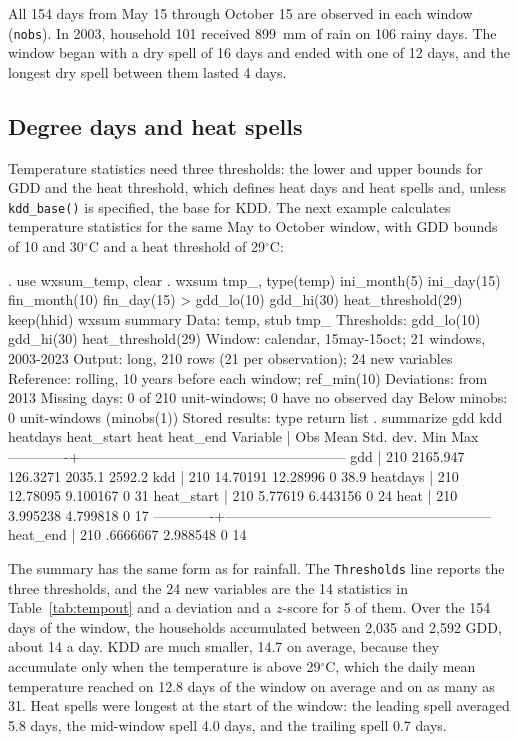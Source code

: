 \noindent All 154 days from May 15 through October 15 are observed in each window (\texttt{nobs}). In 2003, household 101 received 899~mm of rain on 106 rainy days. The window began with a dry spell of 16 days and ended with one of 12 days, and the longest dry spell between them lasted 4 days.


\subsection{Degree days and heat spells} \label{sec:ex-heat}

Temperature statistics need three thresholds: the lower and upper bounds for GDD and the heat threshold, which defines heat days and heat spells and, unless \texttt{kdd\_base()} is specified, the base for KDD. The next example calculates temperature statistics for the same May to October window, with GDD bounds of 10 and 30$^{\circ}$C and a heat threshold of 29$^{\circ}$C:

\begin{stlog}
. use wxsum_temp, clear
{\smallskip}
. wxsum tmp_, type(temp) ini_month(5) ini_day(15) fin_month(10) fin_day(15)
> gdd_lo(10) gdd_hi(30) heat_threshold(29) keep(hhid)
{\smallskip}
wxsum summary
  Data:          temp, stub tmp_
  Thresholds:    gdd_lo(10) gdd_hi(30) heat_threshold(29)
  Window:        calendar, 15may-15oct; 21 windows, 2003-2023
  Output:        long, 210 rows (21 per observation); 24 new variables
  Reference:     rolling, 10 years before each window; ref_min(10)
  Deviations:    from 2013
  Missing days:  0 of 210 unit-windows; 0 have no observed day
  Below minobs:  0 unit-windows (minobs(1))
  Stored results: type return list
{\smallskip}
. summarize gdd kdd heatdays heat_start heat heat_end
{\smallskip}
    Variable |        Obs        Mean    Std. dev.       Min        Max
-------------+---------------------------------------------------------
         gdd |        210    2165.947    126.3271     2035.1     2592.2
         kdd |        210    14.70191    12.28996          0       38.9
    heatdays |        210    12.78095    9.100167          0         31
  heat_start |        210     5.77619    6.443156          0         24
        heat |        210    3.995238    4.799818          0         17
-------------+---------------------------------------------------------
    heat_end |        210    .6666667    2.988548          0         14
\end{stlog}

\noindent The summary has the same form as for rainfall. The \texttt{Thresholds} line reports the three thresholds, and the 24 new variables are the 14 statistics in Table~\ref{tab:tempout} and a deviation and a $z$-score for 5 of them. Over the 154 days of the window, the households accumulated between 2,035 and 2,592 GDD, about 14 a day. KDD are much smaller, 14.7 on average, because they accumulate only when the temperature is above 29$^{\circ}$C, which the daily mean temperature reached on 12.8 days of the window on average and on as many as 31. Heat spells were longest at the start of the window: the leading spell averaged 5.8 days, the mid-window spell 4.0 days, and the trailing spell 0.7 days.

